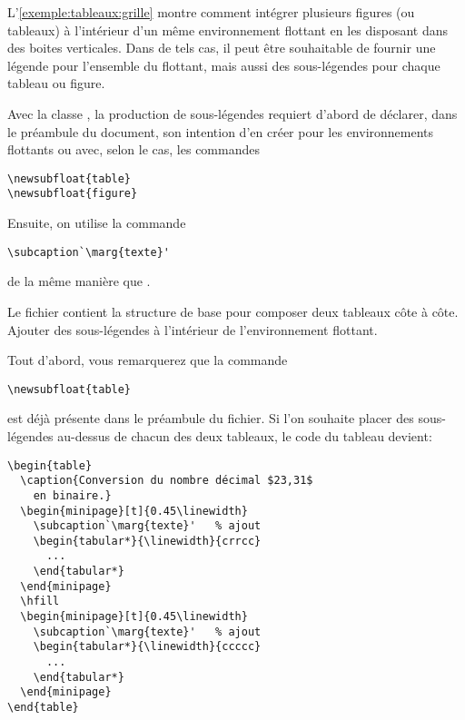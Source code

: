 \begin{exercice}
  \label{ex:tableaux:subcaptions}
  L'\autoref{exemple:tableaux:grille} montre comment intégrer
  plusieurs figures (ou tableaux) à l'intérieur d'un même
  environnement flottant en les disposant dans des boites verticales.
  Dans de tels cas, il peut être souhaitable de fournir une légende
  pour l'ensemble du flottant, mais aussi des sous-légendes pour
  chaque tableau ou figure.

  Avec la classe , la production de sous-légendes
  requiert d'abord de déclarer, dans le préambule du document, son
  intention d'en créer pour les environnements flottants  ou
   avec, selon le cas, les commandes
\begin{lstlisting}
\newsubfloat{table}
\newsubfloat{figure}
\end{lstlisting}
  Ensuite, on utilise la commande
\begin{lstlisting}
\subcaption`\marg{texte}'
\end{lstlisting}
  de la même manière que \cmd{\caption}.

  Le fichier  contient la structure
  de base pour composer deux tableaux côte à côte. Ajouter des
  sous-légendes à l'intérieur de l'environnement flottant.
  \begin{sol}
    Tout d'abord, vous remarquerez que la commande
\begin{lstlisting}
\newsubfloat{table}
\end{lstlisting}
    est déjà présente dans le préambule du fichier. Si l'on souhaite
    placer des sous-légendes au-dessus de chacun des deux tableaux, le
    code du tableau devient:
\begin{lstlisting}
\begin{table}
  \caption{Conversion du nombre décimal $23,31$
    en binaire.}
  \begin{minipage}[t]{0.45\linewidth}
    \subcaption`\marg{texte}'   % ajout
    \begin{tabular*}{\linewidth}{crrcc}
      ...
    \end{tabular*}
  \end{minipage}
  \hfill
  \begin{minipage}[t]{0.45\linewidth}
    \subcaption`\marg{texte}'   % ajout
    \begin{tabular*}{\linewidth}{ccccc}
      ...
    \end{tabular*}
  \end{minipage}
\end{table}
\end{lstlisting}
  \end{sol}
\end{exercice}

